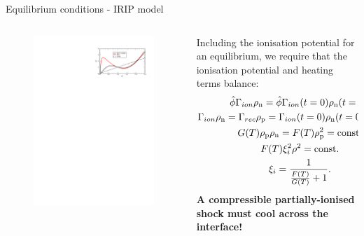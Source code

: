\documentclass[10pt,aspectratio=169,usenames,dvipsnames]{beamer}
\begin{document}
\begin{frame}{Equilibrium conditions - IRIP model}
\begin{columns}
\begin{column}{0.45\textwidth}
\begin{figure}
    \includegraphics[width=0.95\linewidth]{2023DundeeInterview/Figures/aa39667-20-fig2.pdf}
\end{figure}
\end{column}
\begin{column}{0.55\textwidth}
Including the ionisation potential for an equilibrium, we require that the ionisation potential and heating terms balance:
\begin{gather}
    \hat{\phi} \Gamma _{ion} \rho_{\rm n} = \hat{\phi} \Gamma _{ion} (t=0) \rho _{\rm n} (t=0), \\
    \Gamma _{ion} \rho_{\rm n} = \Gamma _{rec} \rho_{\rm p} = \Gamma _{ion} (t=0) \rho _{\rm n} (t=0) =\mbox{const.} \\
    G(T)\rho_{\rm p} \rho_{\rm n} = F(T) \rho_{\rm p} ^2 = \mbox{const.} \\
    F(T) \xi_i ^2 \rho ^2 = \mbox{const.} \\
     \xi_i=\frac{1}{\frac{F(T)}{G(T)} +1}.
\end{gather}
\textbf{A compressible partially-ionised shock must cool across the interface!}
\end{column}
\end{columns}
\end{frame}
\end{document}
